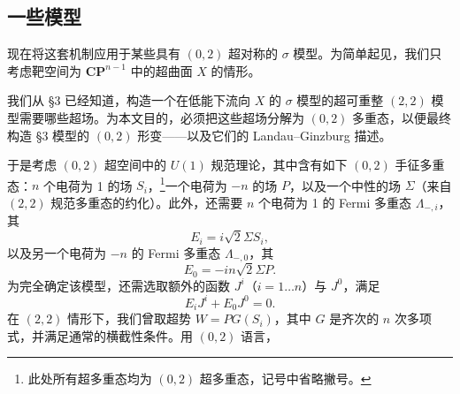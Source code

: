 
\label{op:82}
\subsection{一些模型}

现在将这套机制应用于某些具有 $(0,2)$ 超对称的 $\sigma$ 模型。为简单起见，我们只考虑靶空间为 $\mathbf{CP}^{n-1}$ 中的超曲面 $X$ 的情形。

我们从 §3 已经知道，构造一个在低能下流向 $X$ 的 $\sigma$ 模型的超可重整 $(2,2)$ 模型需要哪些超场。为本文目的，必须把这些超场分解为 $(0,2)$ 多重态，以便最终构造 §3 模型的 $(0,2)$ 形变——以及它们的 Landau--Ginzburg 描述。

于是考虑 $(0,2)$ 超空间中的 $U(1)$ 规范理论，其中含有如下 $(0,2)$ 手征多重态：$n$ 个电荷为 1 的场 $S_i$，\footnote{此处所有超多重态均为 $(0,2)$ 超多重态，记号中省略撇号。}一个电荷为 $-n$ 的场 $P$，以及一个中性的场 $\Sigma$（来自 $(2,2)$ 规范多重态的约化）。此外，还需要 $n$ 个电荷为 1 的 Fermi 多重态 $\Lambda_{-,i}$，其
\begin{equation}\tag{6.35}
E_i=i\sqrt2\Sigma S_i,
\end{equation}
以及另一个电荷为 $-n$ 的 Fermi 多重态 $\Lambda_{-,0}$，其
\begin{equation}\tag{6.36}
E_0=-in\sqrt2\Sigma P.
\end{equation}
为完全确定该模型，还需选取额外的函数 $J^i$（$i=1\ldots n$）与 $J^0$，满足
\begin{equation}\tag{6.37}
E_iJ^i+E_0J^0=0.
\end{equation}
在 $(2,2)$ 情形下，我们曾取超势 $W=PG(S_i)$，其中 $G$ 是齐次的 $n$ 次多项式，并满足通常的横截性条件。用 $(0,2)$ 语言，


